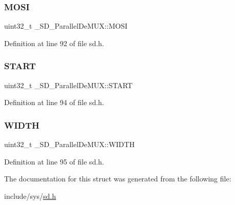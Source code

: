 \mbox{\label{struct__SD__ParallelDeMUX_a58d641ca0b83bf9e0f0fb99d3df376a1}} 
\subsubsection{\texorpdfstring{MOSI}{MOSI}}
{\footnotesize\ttfamily uint32\+\_\+t \+\_\+\+S\+D\+\_\+\+Parallel\+De\+M\+U\+X\+::\+M\+O\+SI}



Definition at line 92 of file sd.\+h.

\mbox{\label{struct__SD__ParallelDeMUX_a05b9cdf46f868b918ccf49e00c4726f8}} 
\subsubsection{\texorpdfstring{START}{START}}
{\footnotesize\ttfamily uint32\+\_\+t \+\_\+\+S\+D\+\_\+\+Parallel\+De\+M\+U\+X\+::\+S\+T\+A\+RT}



Definition at line 94 of file sd.\+h.

\mbox{\label{struct__SD__ParallelDeMUX_a8abd43dfbde65f31ae542e219654f2e1}} 
\subsubsection{\texorpdfstring{WIDTH}{WIDTH}}
{\footnotesize\ttfamily uint32\+\_\+t \+\_\+\+S\+D\+\_\+\+Parallel\+De\+M\+U\+X\+::\+W\+I\+D\+TH}



Definition at line 95 of file sd.\+h.



The documentation for this struct was generated from the following file\+:\begin{DoxyCompactItemize}
\item 
include/sys/\mbox{\hyperlink{sd_8h}{sd.\+h}}\end{DoxyCompactItemize}
